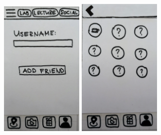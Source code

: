 \documentclass[10pt,twocolumn]{article} %
\begin{document}
\includegraphics[width=0.3\textwidth]{./figures/refined_proto/16.jpg}\hfill
\includegraphics[width=0.3\textwidth]{./figures/refined_proto/17.jpg}\hfill\hfill

\newpage


\newpage
\end{document}
